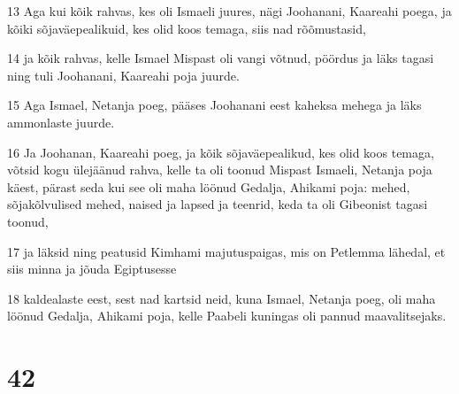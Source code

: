 \par 13 Aga kui kõik rahvas, kes oli Ismaeli juures, nägi Joohanani, Kaareahi poega, ja kõiki sõjaväepealikuid, kes olid koos temaga, siis nad rõõmustasid,
\par 14 ja kõik rahvas, kelle Ismael Mispast oli vangi võtnud, pöördus ja läks tagasi ning tuli Joohanani, Kaareahi poja juurde.
\par 15 Aga Ismael, Netanja poeg, pääses Joohanani eest kaheksa mehega ja läks ammonlaste juurde.
\par 16 Ja Joohanan, Kaareahi poeg, ja kõik sõjaväepealikud, kes olid koos temaga, võtsid kogu ülejäänud rahva, kelle ta oli toonud Mispast Ismaeli, Netanja poja käest, pärast seda kui see oli maha löönud Gedalja, Ahikami poja: mehed, sõjakõlvulised mehed, naised ja lapsed ja teenrid, keda ta oli Gibeonist tagasi toonud,
\par 17 ja läksid ning peatusid Kimhami majutuspaigas, mis on Petlemma lähedal, et siis minna ja jõuda Egiptusesse
\par 18 kaldealaste eest, sest nad kartsid neid, kuna Ismael, Netanja poeg, oli maha löönud Gedalja, Ahikami poja, kelle Paabeli kuningas oli pannud maavalitsejaks.

\chapter{42}

